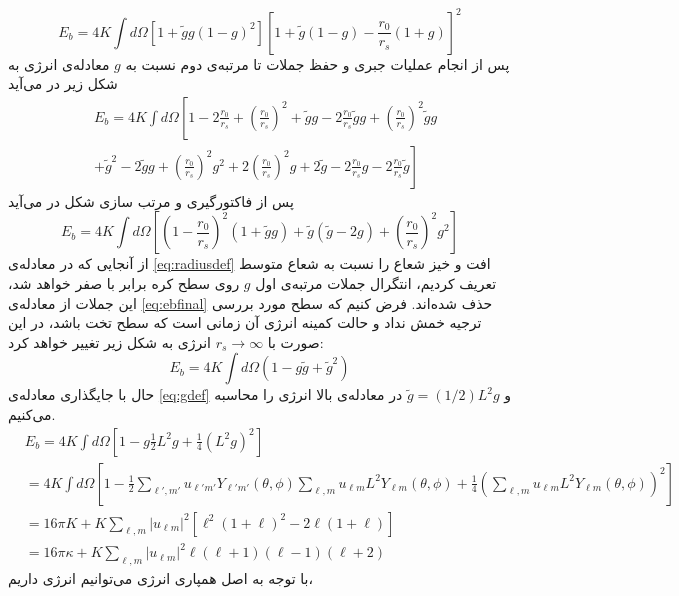 \begin{equation}
E_b=4K\int d\Omega\left[1+\tilde gg(1-g)^2\right]\left[1+\tilde g(1-g)-\frac{r_0}{r_s}(1+g)\right]^2
\end{equation}
پس از انجام عملیات جبری و حفظ جملات تا مرتبه‌ی دوم نسبت به $g$
معادله‌ی انرژی به شکل زیر در می‌آید
\begin{equation}
\begin{aligned}
&E_b=4K\int d\Omega\left[1-2\frac{r_0}{r_s}+\left(\frac{r_0}{r_s}\right)^2+\tilde gg -2\frac{r_0}{r_s}\tilde gg+\left(\frac{r_0}{r_s}\right)^2\tilde gg\right.\\
&\left.+\tilde g^2-2\tilde gg +\left(\frac{r_0}{r_s}\right)^2g^2+2\left(\frac{r_0}{r_s}\right)^2g+2\tilde g-2\frac{r_0}{r_s}g-2\frac{r_0}{r_s}\tilde g\right]
\end{aligned}
\end{equation}
پس از فاکتورگیری و مرتب سازی شکل در می‌آید
\begin{equation}
E_b=4K\int d\Omega\left[\left(1-\frac{r_0}{r_s}\right)^2(1+\tilde gg)+\tilde g(\tilde g-2g)+\left(\frac{r_0}{r_s}\right)^2g^2\right]
\label{eq:ebfinal}
\end{equation}
از آنجایی که در معادله‌ی
\ref{eq:radiusdef}
افت و خیز شعاع را نسبت به شعاع متوسط تعریف کردیم، انتگرال جملات مرتبه‌ی اول $g$ روی سطح کره برابر با صفر خواهد شد، این جملات از معادله‌ی 
\ref{eq:ebfinal}
حذف شده‌اند. فرض کنیم که سطح مورد بررسی ترجیه خمش نداد و حالت کمینه انرژی آن زمانی است که سطح تخت باشد، در این صورت با $r_s\rightarrow\infty$ انرژی به شکل زیر تغییر خواهد کرد:
\begin{equation}
E_b=4K\int d\Omega\left(1-g\tilde g+\tilde g^2\right)
\label{eq:ebfinalnors}
\end{equation}
حال با جایگذاری معادله‌ی
\ref{eq:gdef}
و $\tilde g=(1/2)L^2g$ در معادله‌ی بالا انرژی را محاسبه می‌کنیم.
\begin{equation}
\begin{aligned}
&E_b=4K\int d\Omega\left[1-g\frac{1}{2}L^2g+\frac{1}{4}\left(L^2g\right)^2\right]\\
&=4K\int d\Omega\left[1-\frac{1}{2}\sum_{\ell',m'}u_{\ell' m'}Y_{\ell' m'} (\theta,\phi)\sum_{\ell,m}u_{\ell m}L^2Y_{\ell m} (\theta,\phi)+\frac{1}{4}\left(\sum_{\ell,m}u_{\ell m}L^2Y_{\ell m} (\theta,\phi)\right)^2\right]\\
&=16\pi K+K\sum_{\ell,m}|u_{\ell m}|^2\left[\ell^2(1+\ell)^2-2\ell(1+\ell)\right]\\
&=16\pi\kappa+K\sum_{\ell,m}|u_{\ell m}|^2\ell(\ell+1)(\ell-1)(\ell+2)
\end{aligned}
\end{equation}
با توجه به اصل همپاری انرژی می‌توانیم انرژی داریم،





















